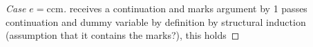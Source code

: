 \documentclass[ms,electronic,twosidetoc,letterpaper,chaptercenter,parttop]{byumsphd}
\begin{document}











\begin{proof}[Case $e=\mathrm{ccm}$]
receives a continuation and marks argument by 1
passes continuation and dummy variable by definition
by structural induction (assumption that it contains the marks?), this holds
\end{proof}










 



    
\end{document}
